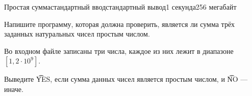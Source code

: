 \begin{problem}{Простая сумма}{стандартный ввод}{стандартный вывод}{1 секунда}{256 мегабайт}

Напишите программу, которая должна проверить, является ли сумма трёх заданных натуральных чисел простым числом.

\InputFile
Во входном файле записаны три числа, каждое из них лежит в диапазоне $[1, 2 \cdot 10^9]$.

\OutputFile
Выведите \t{YES}, если сумма данных чисел является простым числом, и \t{NO} --- иначе.

\Example

\begin{example}
%
\end{example}

\end{problem}

